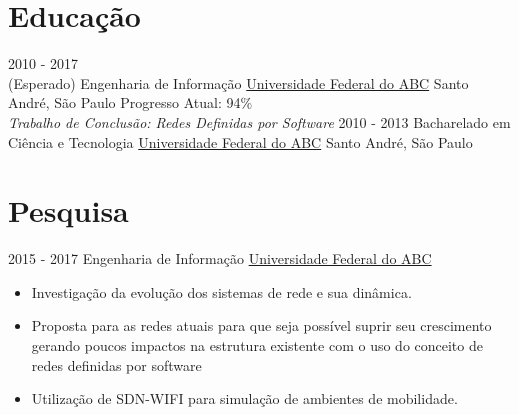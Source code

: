 \documentclass[letterpaper]{twentysecondcv} %
\begin{document}
\makeprofile %

\section{Educação}

\begin{twenty} %
	\twentyitem
    	{2010 - 2017 \\ (Esperado)}
        {Engenharia de Informação}
        {\href{http://www.ufabc.edu.br/}{Universidade Federal do ABC}}
        {Santo André, São Paulo}
        {Progresso Atual: 94\% \\ \textit{Trabalho de Conclusão: Redes Definidas por Software}}
	\twentyitem
    	{2010 - 2013}
        {Bacharelado em Ciência e Tecnologia}
        {\href{http://www.ufabc.edu.br/}{Universidade Federal do ABC}}
        {Santo André, São Paulo}
        {}
\end{twenty}


\section{Pesquisa}
\begin{twenty}
	\twentyitem
    	{2015 - 2017}
        {Engenharia de Informação}
        {\href{http://www.ufabc.edu.br/}{Universidade Federal do ABC}}
        {}
        {
        {\begin{itemize}
        \item Investigação da evolução dos sistemas de rede e sua dinâmica.
        \item Proposta para as redes atuais para que seja possível suprir seu crescimento gerando poucos impactos na estrutura existente com o uso do conceito de redes definidas por software 
        \item Utilização de SDN-WIFI para simulação de ambientes de mobilidade.
       
    \end{itemize}}
        }
\end{twenty}

\end{document}
